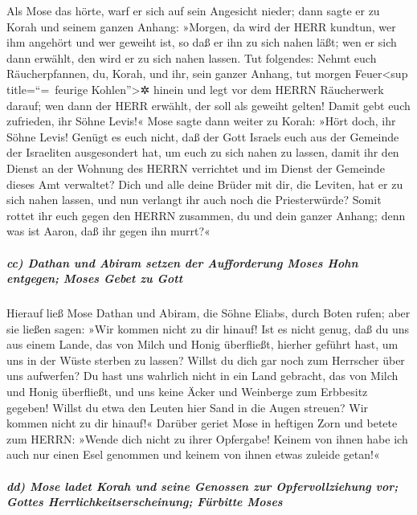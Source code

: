 Als Mose das hörte, warf er sich auf sein Angesicht
nieder; dann sagte er zu Korah und seinem ganzen Anhang:
»Morgen, da wird der HERR kundtun, wer ihm angehört und wer geweiht ist,
so daß er ihn zu sich nahen läßt; wen er sich dann erwählt, den wird er
zu sich nahen lassen. Tut folgendes: Nehmt euch
Räucherpfannen, du, Korah, und ihr, sein ganzer Anhang,
tut morgen Feuer\textless sup title=``=~feurige
Kohlen''\textgreater✲ hinein und legt vor dem HERRN Räucherwerk darauf;
wen dann der HERR erwählt, der soll als geweiht gelten! Damit gebt euch
zufrieden, ihr Söhne Levis!« Mose sagte dann weiter zu
Korah: »Hört doch, ihr Söhne Levis! Genügt es euch nicht,
daß der Gott Israels euch aus der Gemeinde der Israeliten ausgesondert
hat, um euch zu sich nahen zu lassen, damit ihr den Dienst an der
Wohnung des HERRN verrichtet und im Dienst der Gemeinde dieses Amt
verwaltet? Dich und alle deine Brüder mit dir, die
Leviten, hat er zu sich nahen lassen, und nun verlangt ihr auch noch die
Priesterwürde? Somit rottet ihr euch gegen den HERRN
zusammen, du und dein ganzer Anhang; denn was ist Aaron, daß ihr gegen
ihn murrt?«

\hypertarget{cc-dathan-und-abiram-setzen-der-aufforderung-moses-hohn-entgegen-moses-gebet-zu-gott}{%
\subparagraph{cc) Dathan und Abiram setzen der Aufforderung Moses Hohn
entgegen; Moses Gebet zu
Gott}\label{cc-dathan-und-abiram-setzen-der-aufforderung-moses-hohn-entgegen-moses-gebet-zu-gott}}

Hierauf ließ Mose Dathan und Abiram, die Söhne Eliabs,
durch Boten rufen; aber sie ließen sagen: »Wir kommen nicht zu dir
hinauf! Ist es nicht genug, daß du uns aus einem Lande,
das von Milch und Honig überfließt, hierher geführt hast, um uns in der
Wüste sterben zu lassen? Willst du dich gar noch zum Herrscher über uns
aufwerfen? Du hast uns wahrlich nicht in ein Land
gebracht, das von Milch und Honig überfließt, und uns keine Äcker und
Weinberge zum Erbbesitz gegeben! Willst du etwa den Leuten hier Sand in
die Augen streuen? Wir kommen nicht zu dir hinauf!«
Darüber geriet Mose in heftigen Zorn und betete zum
HERRN: »Wende dich nicht zu ihrer Opfergabe! Keinem von ihnen habe ich
auch nur einen Esel genommen und keinem von ihnen etwas zuleide getan!«

\hypertarget{dd-mose-ladet-korah-und-seine-genossen-zur-opfervollziehung-vor-gottes-herrlichkeitserscheinung-fuxfcrbitte-moses}{%
\subparagraph{dd) Mose ladet Korah und seine Genossen zur
Opfervollziehung vor; Gottes Herrlichkeitserscheinung; Fürbitte
Moses}\label{dd-mose-ladet-korah-und-seine-genossen-zur-opfervollziehung-vor-gottes-herrlichkeitserscheinung-fuxfcrbitte-moses}}

